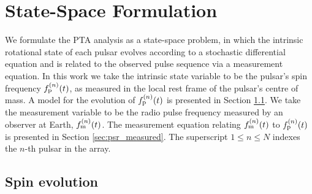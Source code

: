 \documentclass[fleqn,usenatbib,useAMS]{mnras}
\begin{document}
%
%



\section{State-Space Formulation}\label{sec:model}
We formulate the PTA analysis as a state-space problem, in which the intrinsic rotational state of each pulsar evolves according to a stochastic differential equation and is related to the observed pulse sequence via a measurement equation. In this work we take the intrinsic state variable to be the pulsar's spin frequency $f_{\rm p}^{(n)}(t)$, as measured in the local rest frame of the pulsar's centre of mass. A model for the evolution of $f_{\rm p}^{(n)}(t)$ is presented in Section \ref{sec:psr_frequency}.  We take the measurement variable to be the radio pulse frequency measured by an observer at Earth, $f_{\rm m}^{(n)}(t)$.  The measurement equation relating $f_{\rm m}^{(n)}(t)$ to $f_{\rm p}^{(n)}(t)$ is presented in Section \ref{sec:psr_measured}. The superscript $1\leq n\leq N$ indexes the $n$-th pulsar in the array.
\subsection{Spin evolution} \label{sec:psr_frequency}
\end{document}
